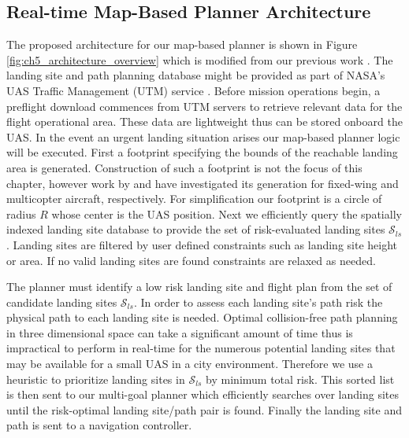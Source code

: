 \subsection{Real-time Map-Based Planner Architecture}\label{sec:ch5_architecture_planner}

The proposed architecture for our map-based planner is shown in Figure \ref{fig:ch5_architecture_overview} which is modified from our previous work \cite{atkins_emergency_2006, castagno_comprehensive_2018}. The landing site and path planning database might be provided as part of NASA's \ac{UAS} Traffic Management (UTM) service \cite{prevot_uas_2016}. Before mission operations begin, a preflight download commences from UTM servers to retrieve relevant data for the flight operational area.  These data are lightweight thus can be stored onboard the UAS. 
In the event an urgent landing situation arises our map-based planner logic will be executed. First a footprint specifying the bounds of the reachable landing area is generated. Construction of such a footprint is not the focus of this chapter, however work by \cite{paul_flight_2017, atkins_emergency_2006} and \cite{ten_harmsel_emergency_2017} have investigated its generation for fixed-wing and multicopter aircraft, respectively. For simplification our footprint is a circle of radius $R$ whose center is the \ac{UAS} position. Next we efficiently query the spatially indexed landing site database to provide the set of risk-evaluated landing sites $\mathcal{S}_{ls}$. Landing sites are filtered by user defined constraints such as landing site height or area. If no valid landing sites are found constraints are relaxed as needed.

The planner must identify a low risk landing site and flight plan  from the set of candidate landing sites $\mathcal{S}_{ls}$.  In order to assess each landing site's path risk the physical path to each landing site is needed. Optimal collision-free path planning in three dimensional space can take a significant amount of time thus is impractical to perform in real-time for the numerous potential landing sites that may be available for a small \ac{UAS} in a city environment. Therefore we use a heuristic to prioritize landing sites in $\mathcal{S}_{ls}$ by minimum total risk. This sorted list is then sent to our multi-goal planner which efficiently searches over landing sites until the risk-optimal landing site/path pair is found. Finally the landing site and path is sent to a navigation controller. 

